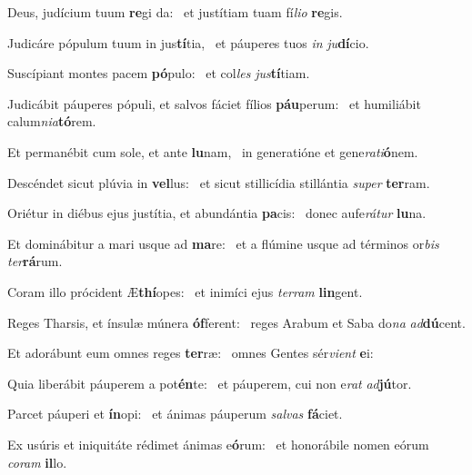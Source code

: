 \item Deus, judícium tuum \textbf{re}gi da:~\psstar{} et justítiam tuam fí\textit{lio} \textbf{re}gis.

\item Judicáre pópulum tuum in jus\textbf{tí}tia,~\psstar{} et páuperes tuos \textit{in} \textit{ju}\textbf{dí}cio.

\item Suscípiant montes pacem \textbf{pó}pulo:~\psstar{} et col\textit{les} \textit{jus}\textbf{tí}tiam.

\item Judicábit páuperes pópuli, et salvos fáciet fílios \textbf{páu}perum:~\psstar{} et humiliábit calum\textit{nia}\textbf{tó}rem.

\item Et permanébit cum sole, et ante \textbf{lu}nam,~\psstar{} in generatióne et gene\textit{rati}\textbf{ó}nem.

\item Descéndet sicut plúvia in \textbf{vel}lus:~\psstar{} et sicut stillicídia stillántia \textit{super} \textbf{ter}ram.

\item Oriétur in diébus ejus justítia, et abundántia \textbf{pa}cis:~\psstar{} donec aufe\textit{rátur} \textbf{lu}na.

\item Et dominábitur a mari usque ad \textbf{ma}re:~\psstar{} et a flúmine usque ad términos or\textit{bis} \textit{ter}\textbf{rá}rum.

\item Coram illo prócident Æ\textbf{thí}opes:~\psstar{} et inimíci ejus \textit{terram} \textbf{lin}gent.

\item Reges Tharsis, et ínsulæ múnera \textbf{óf}ferent:~\psstar{} reges Arabum et Saba do\textit{na} \textit{ad}\textbf{dú}cent.

\item Et adorábunt eum omnes reges \textbf{ter}ræ:~\psstar{} omnes Gentes sér\textit{vient} \textbf{e}i:

\item Quia liberábit páuperem a pot\textbf{én}te:~\psstar{} et páuperem, cui non e\textit{rat} \textit{ad}\textbf{jú}tor.

\item Parcet páuperi et \textbf{ín}opi:~\psstar{} et ánimas páuperum \textit{salvas} \textbf{fá}ciet.

\item Ex usúris et iniquitáte rédimet ánimas e\textbf{ó}rum:~\psstar{} et honorábile nomen eórum \textit{coram} \textbf{il}lo.

